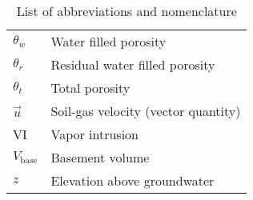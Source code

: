 \documentclass[preprint,12pt]{elsarticle}
\begin{document}
\begin{table}[htb!]
\begin{tabular}{l l}
    $\theta_w$ & Water filled porosity \\
    $\theta_r$ & Residual water filled porosity \\
    $\theta_t$ & Total porosity \\
    $\vec{u}$ & Soil-gas velocity (vector quantity) \\
    VI & Vapor intrusion \\
    $V_\mathrm{base}$ & Basement volume \\
    $z$ & Elevation above groundwater \\
    \bottomrule
  \end{tabular}
  \caption{List of abbreviations and nomenclature}\label{tbl:abbreviations}
\end{table}



\end{document}

